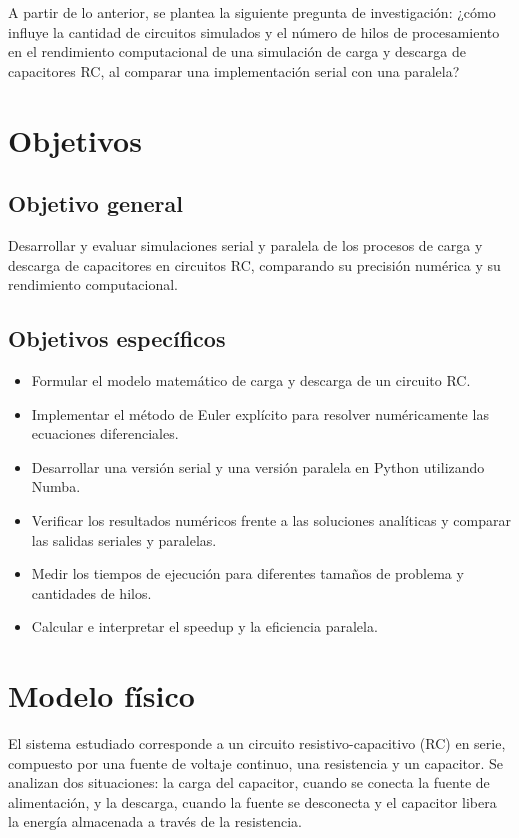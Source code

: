 \documentclass[11pt,a4paper]{article}
\begin{document}
A partir de lo anterior, se plantea la siguiente pregunta de investigación: ¿cómo influye la cantidad de circuitos simulados y el número de hilos de procesamiento en el rendimiento computacional de una simulación de carga y descarga de capacitores RC, al comparar una implementación serial con una paralela?

\section{Objetivos}
\subsection{Objetivo general}
Desarrollar y evaluar simulaciones serial y paralela de los procesos de carga y descarga de capacitores en circuitos RC, comparando su precisión numérica y su rendimiento computacional.

\subsection{Objetivos específicos}
\begin{itemize}[leftmargin=*]
    \item Formular el modelo matemático de carga y descarga de un circuito RC.
    \item Implementar el método de Euler explícito para resolver numéricamente las ecuaciones diferenciales.
    \item Desarrollar una versión serial y una versión paralela en Python utilizando Numba.
    \item Verificar los resultados numéricos frente a las soluciones analíticas y comparar las salidas seriales y paralelas.
    \item Medir los tiempos de ejecución para diferentes tamaños de problema y cantidades de hilos.
    \item Calcular e interpretar el speedup y la eficiencia paralela.
\end{itemize}


\section{Modelo físico}

El sistema estudiado corresponde a un circuito resistivo-capacitivo
(RC) en serie, compuesto por una fuente de voltaje continuo, una
resistencia y un capacitor. Se analizan dos situaciones: la carga
del capacitor, cuando se conecta la fuente de alimentación, y la
descarga, cuando la fuente se desconecta y el capacitor libera la
energía almacenada a través de la resistencia.
\end{document}
